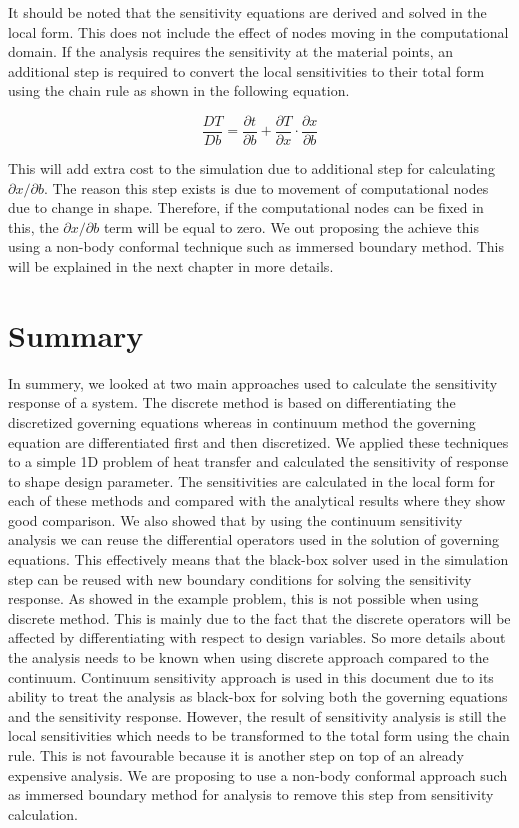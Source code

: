It should be noted that the sensitivity equations are derived and solved in the local form. This does not include the effect of nodes moving in the computational domain. If the analysis requires the sensitivity at the material points, an additional step is required to convert the local sensitivities to their total form using the chain rule as shown in the following equation.

\begin{equation*}
	\frac{DT}{Db} = \frac{\partial t}{\partial b} + \frac{\partial T}{\partial x} \cdot \frac{\partial x}{\partial b}
\end{equation*}

This will add extra cost to the simulation due to additional step for calculating $\partial x/\partial b$. The reason this step exists is due to movement of computational nodes due to change in shape. Therefore, if the computational nodes can be fixed in this, the $\partial x/\partial b$ term will be equal to zero. We out proposing the achieve this using a non-body conformal technique such as immersed boundary method. This will be explained in the next chapter in more details.

\section{Summary}
In summery, we looked at two main approaches used to calculate the sensitivity response of a system. The discrete method is based on differentiating the discretized governing equations whereas in continuum method the governing equation are differentiated first and then discretized. We applied these techniques to a simple 1D problem of heat transfer and calculated the sensitivity of response to shape design parameter. The sensitivities are calculated in the local form for each of these methods and compared with the analytical results where they show good comparison. We also showed that by using the continuum sensitivity analysis we can reuse the differential operators used in the solution of governing equations. This effectively means that the black-box solver used in the simulation step can be reused with new boundary conditions for solving the sensitivity response. As showed in the example problem, this is not possible when using discrete method. This is mainly due to the fact that the discrete operators will be affected by differentiating with respect to design variables. So more details about the analysis needs to be known when using discrete approach compared to the continuum. Continuum sensitivity approach is used in this document due to its ability to treat the analysis as black-box for solving both the governing equations and the sensitivity response. However, the result of sensitivity analysis is still the local sensitivities which needs to be transformed to the total form using the chain rule. This is not favourable because it is another step on top of an already expensive analysis. We are proposing to use a non-body conformal approach such as immersed boundary method for analysis to remove this step from sensitivity calculation.